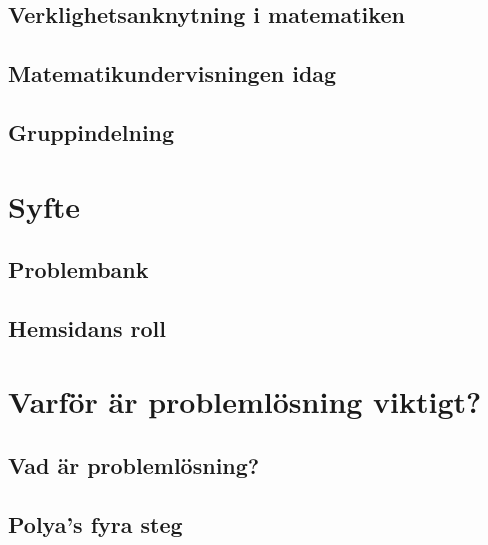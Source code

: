 \documentclass[11pt,a4paper]{article}
\begin{document}
    \subsection{Verklighetsanknytning i matematiken}
        \label{sec:Verklighetsanknytning}
        
        
    \subsection{Matematikundervisningen idag}
        
        
    \subsection{Gruppindelning}
        \label{sec:Gruppindelning}
        

\section{Syfte}
    
    
    \subsection{Problembank}
        
    
    \subsection{Hemsidans roll}
        
\section{Varför är problemlösning viktigt?}
    \label{sec:Teori}
    
        
    \subsection{Vad är problemlösning?}
        \label{sec:problemdef}
        
        
    \subsection{Polya's fyra steg}
        \label{sec:polya}
        
        
\end{document}
